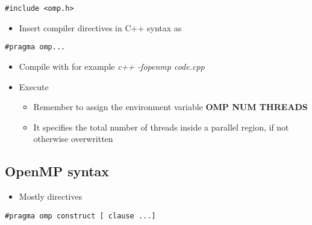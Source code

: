 \noindent


\begin{verbatim}
#include <omp.h>

\end{verbatim}

\begin{itemize}
 \item Insert compiler directives in C++ syntax as 
\end{itemize}

\noindent


\begin{verbatim}
#pragma omp...

\end{verbatim}

\begin{itemize}
\item Compile with for example \emph{c++ -fopenmp code.cpp}

\item Execute
\begin{itemize}

  \item Remember to assign the environment variable \textbf{OMP NUM THREADS}

  \item It specifies the total number of threads inside a parallel region, if not otherwise overwritten
\end{itemize}

\noindent
\end{itemize}

\noindent



\subsection*{OpenMP syntax}
\begin{itemize}
\item Mostly directives
\end{itemize}

\noindent


\begin{verbatim}
#pragma omp construct [ clause ...]

\end{verbatim}

